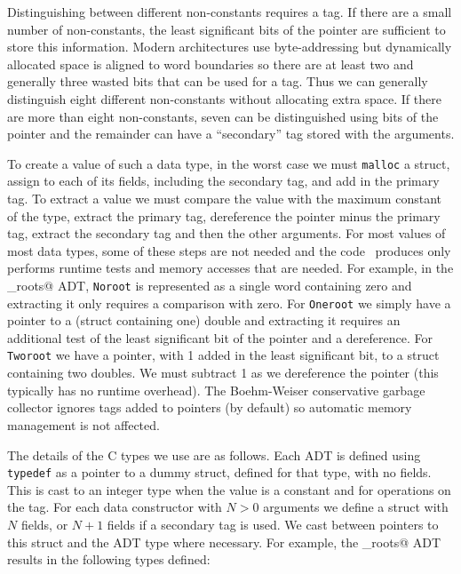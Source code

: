 Distinguishing between different non-constants requires a tag.  If there
are a small number of non-constants, the least significant bits of the
pointer are sufficient to store this information.  Modern architectures
use byte-addressing but dynamically allocated space is aligned to word
boundaries so there are at least two and generally three wasted bits
that can be used for a tag.  Thus we can generally distinguish eight
different non-constants without allocating extra space.  If there are
more than eight non-constants, seven can be distinguished using bits of
the pointer and the remainder can have a ``secondary'' tag stored with
the arguments.

To create a value of such a data type, in the worst case we must
\texttt{malloc} a struct, assign to each of its fields, including the
secondary tag, and add in the primary tag.  To extract a value we must
compare the value with the maximum constant of the type, extract the
primary tag, dereference the pointer minus the primary tag, extract the
secondary tag and then the other arguments.  For most values of most
data types, some of these steps are not needed and the code
\adtpp\ produces only performs runtime tests and memory accesses
that are needed.  For example, in the
\verb@quad_roots@ ADT, \texttt{Noroot} is represented as a single word
containing zero and extracting it only requires a comparison with zero.
For \texttt{Oneroot} we simply have a pointer to a (struct containing one)
double and extracting it requires an additional test of the least
significant bit of the pointer and a dereference.  For \texttt{Tworoot}
we have a pointer, with 1 added in the least significant bit, to a
struct containing two doubles.  We must subtract 1 as we dereference the
pointer (this typically has no runtime overhead).  The Boehm-Weiser
conservative garbage collector ignores tags added to pointers (by default)
so automatic memory management is not affected.

The details of the C types we use are as follows.  Each ADT is defined
using \texttt{typedef} as a pointer to a dummy struct, defined for that
type, with no fields.  This is cast to an integer type when the value
is a constant and for operations on the tag.  For each data constructor
with $N>0$ arguments we define a struct with $N$ fields, or $N+1$ fields
if a secondary tag is used.  We cast between pointers to this struct
and the ADT type where necessary.  For example, the \verb@quad_roots@
ADT results in the following types defined:

